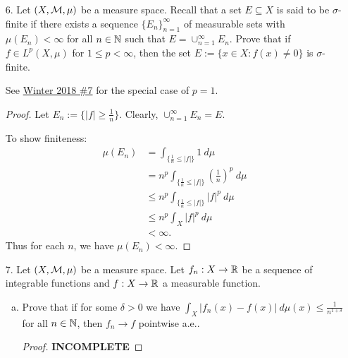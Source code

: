 \begin{itemize}
\begin{enumerate}[(a)]
\begin{proof}
\medskip 

For $n\geq2$, $\mu(E_n) < \delta$. Since  $\mu(\cap_{n=1}^{\infty} E_n) = \lim_{n \rightarrow \infty} \mu(E_n) = \lim_{n \rightarrow \infty} \frac{\delta}{n} = 0$, it must be that $\nu(\cap_{n=1}^{\infty} E_n) = 0$ also. But then $\mu(\cap_{n=1}^{\infty} E_n) < \delta$ while $\mu(\cap_{n=1}^{\infty} E_n) \ngtr \varepsilon$.
\end{proof}
\end{enumerate}



\item[6.]  Let $(X,\mathcal{M},\mu)$ be a measure space. Recall that a set $E \subseteq X$ is said to be $\sigma$-finite if there exists a sequence $\{E_n\}_{n=1}^{\infty}$ of measurable sets with $\mu(E_n)<\infty$ for all $n \in \mathbb{N}$ such that $E = \cup_{n=1}^{\infty} E_n$. Prove that if $f \in L^p(X,\mu)$ for $1 \leq p < \infty$, then the set $E:= \{x \in X : f(x) \neq 0\}$ is $\sigma$-finite.

\label{q:w18-7}
See \hyperref[q:w18-7]{Winter 2018 \#7} for the special case of $p=1$.

\begin{proof}
Let $E_n := \{|f| \geq \frac{1}{n}\}$. Clearly, $\cup_{n=1}^{\infty} E_n = E$.

To show finiteness: 
\begin{align*}
    \mu(E_n) &= \int_{\{\frac{1}{n} \leq |f|\}} 1 \ d\mu \\ 
    &= n^p \int_{\{\frac{1}{n} \leq |f|\}} \left(\frac{1}{n} \right)^p \ d\mu \\ 
    &\leq n^p \int_{\{\frac{1}{n} \leq |f|\}} |f|^p \ d\mu \\ 
    &\leq n^p \int_{X} |f|^p \ d\mu \\
    &< \infty.
\end{align*}
Thus for each $n$, we have $\mu(E_n)<\infty$.
\end{proof}



\item[7.]  Let $(X,\mathcal{M},\mu)$ be a measure space. Let $f_n : X \rightarrow \mathbb{R}$ be a sequence of integrable functions and $f : X \rightarrow \mathbb{R}$ a measurable function.
\begin{enumerate}[(a)]
\item Prove that if for some $\delta > 0$ we have $\int_{X} |f_n(x) - f(x)| \ d\mu(x) \leq \frac{1}{n^{1+\delta}}$ for all $n \in \mathbb{N}$, then $f_n \rightarrow f$ pointwise a.e..
\begin{proof}
\textbf{INCOMPLETE}
\end{proof}


\end{enumerate}
\end{itemize}
